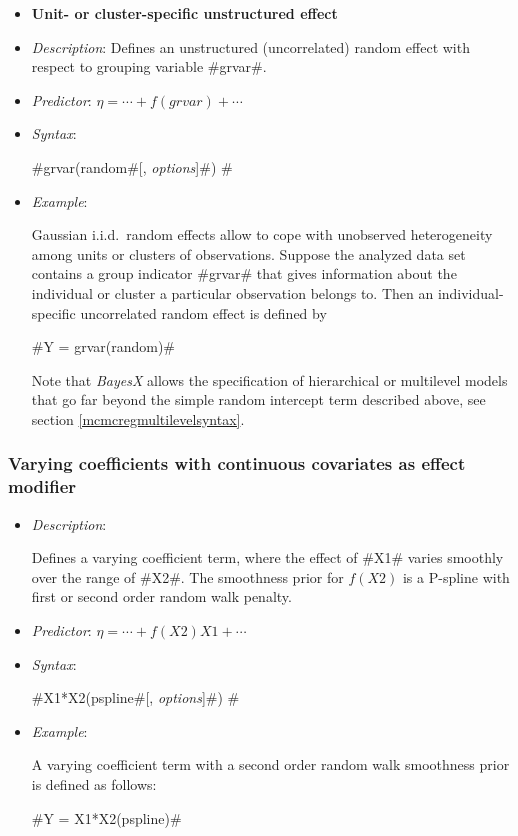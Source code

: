 \begin{itemize}
\item[]{\bf\sffamily Unit- or cluster-specific unstructured effect}

\item[] {\em Description}: Defines an unstructured (uncorrelated)
random effect with respect to grouping variable #grvar#. \item[]
{\em Predictor}: $\eta = \cdots + f(grvar) + \cdots$ \item[] {\em
Syntax}:

#grvar(random#[, {\em options}]#) #
\item[] {\em Example}:

Gaussian i.i.d.~random effects allow to cope with unobserved
heterogeneity among units or clusters of observations. Suppose the
analyzed data set contains a group indicator #grvar# that gives
information about the individual or cluster a particular
observation belongs to. Then an individual-specific uncorrelated
random effect is defined by

#Y = grvar(random)#

Note that {\em BayesX} allows the specification of hierarchical or multilevel models that go far beyond
the simple random intercept term described above, see section \autoref{mcmcregmultilevelsyntax}.
\end{itemize}



\subsubsection*{Varying coefficients with continuous covariates as
effect modifier}

\begin{itemize}

\item[] {\em Description}:

Defines a varying coefficient term, where the effect of #X1#
varies smoothly over the range of #X2#. The smoothness prior for
$f(X2)$ is a P-spline with first or second order random walk
penalty. \item[] {\em Predictor}: $\eta= \cdots + f(X2)X1 +
\cdots$ \item[] {\em Syntax}:

#X1*X2(pspline#[, {\em options}]#) #

\item[] {\em Example}:

A varying coefficient term with a second order random walk
smoothness prior is defined as follows:

#Y = X1*X2(pspline)#
\end{itemize}


